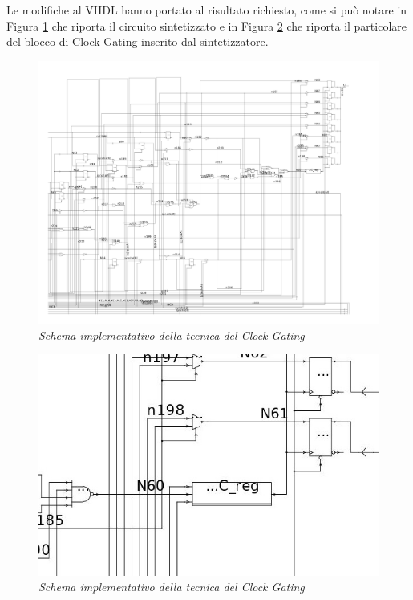 {\noindent Le modifiche al VHDL hanno portato al risultato richiesto, come si può notare in Figura \ref{3_12} che riporta il circuito sintetizzato e in Figura \ref{3_13} che riporta il particolare del blocco di Clock Gating inserito dal sintetizzatore.
\\
\begin{figure}[!htb]
	\centering
	\includegraphics[scale=0.5]{immagini/3_12}
	\caption{\textit{Schema implementativo della tecnica del Clock Gating}}
	\label{3_12}
\end{figure}
\begin{figure}[!htb]
	\centering
	\includegraphics[scale=1.5]{immagini/3_13}
	\caption{\textit{Schema implementativo della tecnica del Clock Gating}}
	\label{3_13}
\end{figure}
\\
}
